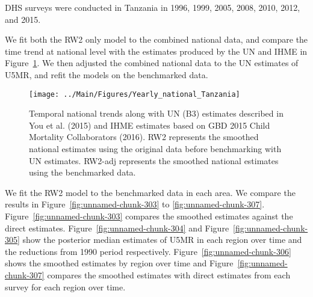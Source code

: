\documentclass[12pt]{article}\usepackage[]{graphicx}\usepackage[]{color}
\newenvironment{knitrout}{}{} %
\begin{document}


DHS surveys were conducted in Tanzania in 1996, 1999, 2005, 2008, 2010, 2012, and 2015.

We fit both the RW2 only model to the combined national data, and compare the time trend at national level with the estimates produced by the UN and IHME in Figure~\ref{fig:unnamed-chunk-302}. We then adjusted the combined national data to the UN estimates of U5MR, and refit the models on the benchmarked data. 

\begin{knitrout}
\color{fgcolor}\begin{figure}[bht]

{\centering \texttt{[image: ../Main/Figures/Yearly\_national\_Tanzania]} 

}

\caption[Temporal national trends along with UN (B3) estimates described in You et al]{Temporal national trends along with UN (B3) estimates described in You et al. (2015) and IHME estimates based on GBD 2015 Child Mortality Collaborators (2016). RW2 represents the smoothed national estimates using the original data before benchmarking with UN estimates. RW2-adj represents the smoothed national estimates using the benchmarked data.}\label{fig:unnamed-chunk-302}
\end{figure}


\end{knitrout}
 

We fit the RW2 model to the benchmarked data in each area. 
We compare the results in Figure~\ref{fig:unnamed-chunk-303} to \ref{fig:unnamed-chunk-307}.
Figure~\ref{fig:unnamed-chunk-303} compares the smoothed estimates against the direct estimates. Figure~\ref{fig:unnamed-chunk-304} and Figure~\ref{fig:unnamed-chunk-305} show the posterior median estimates of U5MR in each region over time and the reductions from 1990 period respectively.
Figure~\ref{fig:unnamed-chunk-306} shows the smoothed estimates by region over time and Figure~\ref{fig:unnamed-chunk-307} compares the smoothed estimates with direct estimates from each survey for each region over time.


\end{document}
